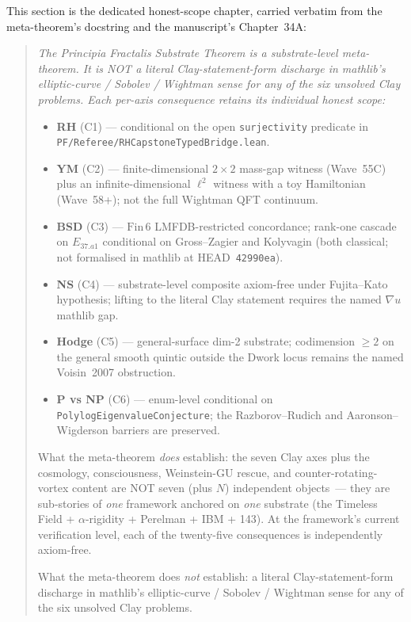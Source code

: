 \documentclass[11pt,a4paper]{article}
\theoremstyle{definition}
\theoremstyle{remark}
\newcommand{\lean}[1]{\texttt{\small #1}}
\begin{document}
This section is the dedicated honest-scope chapter, carried
verbatim from the meta-theorem's docstring and the manuscript's
Chapter~34A:

\medskip
\begin{quote}
\itshape
The Principia Fractalis Substrate Theorem is a substrate-level
meta-theorem. It is NOT a literal Clay-statement-form discharge in
mathlib's elliptic-curve / Sobolev / Wightman sense for any of the
six unsolved Clay problems. Each per-axis consequence retains its
individual honest scope:
\begin{itemize}
\item \textbf{RH} (C1) --- conditional on the open
\lean{surjectivity} predicate in
\lean{PF/Referee/RHCapstoneTypedBridge.lean}.
\item \textbf{YM} (C2) --- finite-dimensional $2 \times 2$ mass-gap
witness (Wave~55C) plus an infinite-dimensional $\ell^{2}$
witness with a toy Hamiltonian (Wave~58+); not the full Wightman
QFT continuum.
\item \textbf{BSD} (C3) --- $\mathrm{Fin}\,6$ LMFDB-restricted
concordance; rank-one cascade on $E_{37.a1}$ conditional on
Gross--Zagier and Kolyvagin (both classical; not formalised in
mathlib at HEAD~\texttt{42990ea}).
\item \textbf{NS} (C4) --- substrate-level composite axiom-free
under Fujita--Kato hypothesis; lifting to the literal Clay
statement requires the named $\nabla u$ mathlib gap.
\item \textbf{Hodge} (C5) --- general-surface dim-2 substrate;
codimension $\ge 2$ on the general smooth quintic outside the
Dwork locus remains the named Voisin~2007 obstruction.
\item \textbf{P vs NP} (C6) --- enum-level conditional on
\lean{PolylogEigenvalueConjecture}; the Razborov--Rudich and
Aaronson--Wigderson barriers are preserved.
\end{itemize}
What the meta-theorem \emph{does} establish: the seven Clay axes
plus the cosmology, consciousness, Weinstein-GU rescue, and
counter-rotating-vortex content are NOT seven (plus $N$)
independent objects~--- they are sub-stories of \emph{one}
framework anchored on \emph{one} substrate (the Timeless Field
+ $\alpha$-rigidity + Perelman + IBM + 143). At the framework's
current verification level, each of the twenty-five consequences
is independently axiom-free.

What the meta-theorem does \emph{not} establish: a literal
Clay-statement-form discharge in mathlib's elliptic-curve /
Sobolev / Wightman sense for any of the six unsolved Clay
problems.
\end{quote}
\medskip
\end{document}
